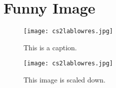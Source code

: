 \section{Funny Image}
\label{app:A}

\begin{figure}[H] %
\centering
\texttt{[image: cs2lablowres.jpg]}
\caption{This is a caption.}
\label{fig:cs2lab}
\end{figure}

\begin{figure}[H] 
\centering
\texttt{[image: cs2lablowres.jpg]}
\caption{This image is scaled down.}
\label{fig:cs2lab_downscaled}
\end{figure}